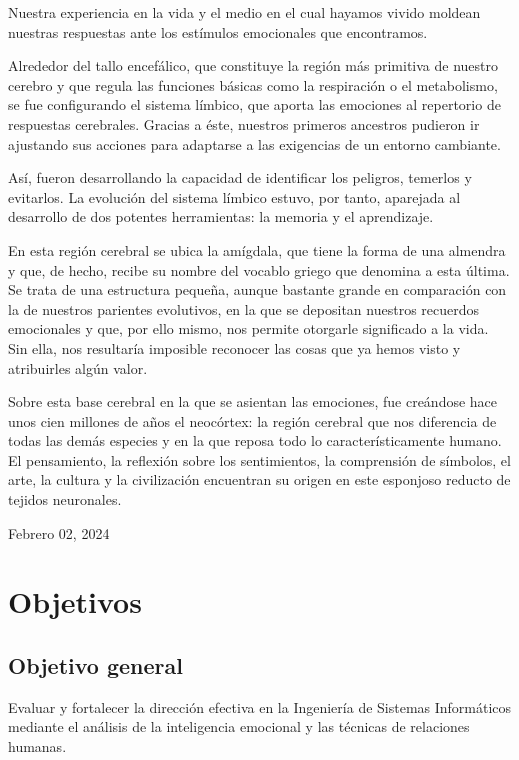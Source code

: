 \documentclass[journal]{IEEEtran}
\begin{document}
Nuestra experiencia en la vida y el medio en el cual hayamos vivido moldean nuestras respuestas ante los estímulos emocionales que encontramos.

Alrededor del tallo encefálico, que constituye la región más primitiva de nuestro cerebro y que regula las funciones básicas como la respiración o el metabolismo, se fue configurando el sistema límbico, que aporta las emociones al repertorio de respuestas cerebrales. Gracias a éste, nuestros primeros ancestros pudieron ir ajustando sus acciones para adaptarse a las exigencias de un entorno cambiante.

Así, fueron desarrollando la capacidad de identificar los peligros, temerlos y evitarlos. La evolución del sistema límbico estuvo, por tanto, aparejada al desarrollo de dos potentes herramientas: la memoria y el aprendizaje.

En esta región cerebral se ubica la amígdala, que tiene la forma de una almendra y que, de hecho, recibe su nombre del vocablo griego que denomina a esta última. Se trata de una estructura pequeña, aunque bastante grande en comparación con la de nuestros parientes evolutivos, en la que se depositan nuestros recuerdos emocionales y que, por ello mismo, nos permite otorgarle significado a la vida. Sin ella, nos resultaría imposible reconocer las cosas que ya hemos visto y atribuirles algún valor.

Sobre esta base cerebral en la que se asientan las emociones, fue creándose hace unos cien millones de años el neocórtex: la región cerebral que nos diferencia de todas las demás especies y en la que reposa todo lo característicamente humano. El pensamiento, la reflexión sobre los sentimientos, la comprensión de símbolos, el arte, la cultura y la civilización encuentran su origen en este esponjoso reducto de tejidos neuronales.

\hfill Febrero 02, 2024

\section{Objetivos}

\subsection{Objetivo general}
Evaluar y fortalecer la dirección efectiva en la Ingeniería de Sistemas Informáticos mediante el análisis de la inteligencia emocional y las técnicas de relaciones humanas.
\end{document}
